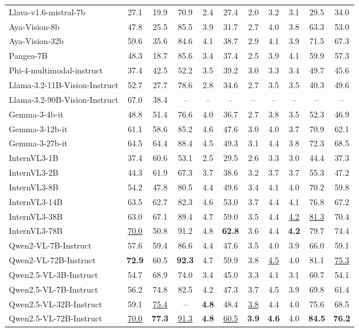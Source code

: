 \begin{table*}[t]
\begin{adjustbox}{max width=\linewidth}
\begin{tabular}{lcccccccccc}
Llava-v1.6-mistral-7b & 27.1 & 19.9 & 70.9 & 2.4 & 27.4 & 2.0 & 3.2 & 3.1 & 29.5 & 34.0 \\
Aya-Vision-8b & 47.8 & 25.5 & 85.5 & 3.9 & 31.7 & 2.7 & 4.0 & 3.8 & 63.3 & 53.0 \\
Aya-Vision-32b & 59.6 & 35.6 & 84.6 & 4.1 & 38.7 & 2.9 & 4.1 & 3.9 & 71.5 & 67.3 \\
Pangea-7B & 48.3 & 18.7 & 85.6 & 3.4 & 37.4 & 2.5 & 3.9 & 4.1 & 59.9 & 57.3 \\
Phi-4-multimodal-instruct & 37.4 & 42.5 & 52.2 & 3.5 & 39.2 & 3.0 & 3.3 & 3.4 & 49.7 & 45.6 \\
Llama-3.2-11B-Vision-Instruct & 52.7 & 27.7 & 78.6 & 2.8 & 34.6 & 2.7 & 3.5 & 3.5 & 40.3 & 49.6 \\
Llama-3.2-90B-Vision-Instruct & 67.0 & 38.4 & -- & -- & -- & -- & -- & -- & -- & -- \\
Gemma-3-4b-it & 48.8 & 51.4 & 76.6 & 4.0 & 36.7 & 2.7 & 3.8 & 3.5 & 52.3 & 46.9 \\
Gemma-3-12b-it & 61.1 & 58.6 & 85.2 & 4.6 & 47.6 & 3.0 & 4.0 & 3.7 & 70.9 & 62.1 \\
Gemma-3-27b-it & 64.5 & 64.4 & 88.4 & 4.5 & 49.3 & 3.1 & 4.4 & 3.8 & 72.3 & 68.5 \\
InternVL3-1B & 37.4 & 60.6 & 53.1 & 2.5 & 29.5 & 2.6 & 3.3 & 3.0 & 44.4 & 37.3 \\
InternVL3-2B & 44.3 & 61.9 & 67.3 & 3.7 & 38.6 & 3.2 & 3.7 & 3.7 & 55.3 & 47.2 \\
InternVL3-8B & 54.2 & 47.8 & 80.5 & 4.4 & 49.6 & 3.4 & 4.1 & 4.0 & 70.2 & 59.8 \\
InternVL3-14B & 63.5 & 62.7 & 82.3 & 4.6 & 53.0 & 3.7 & 4.4 & 4.1 & 76.8 & 67.2 \\
InternVL3-38B & 63.0 & 67.1 & 89.4 & 4.7 & 59.0 & 3.5 & 4.4 & \underline{4.2} & \underline{81.3} & 70.4 \\
InternVL3-78B & \underline{70.0} & 50.8 & 91.2 & 4.8 & \textbf{62.8} & 3.6 & 4.4 & \textbf{4.2} & 79.7 & 74.4 \\
Qwen2-VL-7B-Instruct & 57.6 & 59.4 & 86.6 & 4.4 & 47.6 & 3.5 & 4.0 & 3.9 & 66.0 & 59.1 \\
Qwen2-VL-72B-Instruct & \textbf{72.9} & 60.5 & \textbf{92.3} & 4.7 & 59.9 & 3.8 & \underline{4.5} & 4.0 & 81.1 & \underline{75.3} \\
Qwen2.5-VL-3B-Instruct & 54.7 & 68.9 & 74.0 & 3.4 & 45.0 & 3.3 & 4.1 & 3.1 & 60.7 & 54.1 \\
Qwen2.5-VL-7B-Instruct & 56.2 & 74.8 & 82.5 & 4.2 & 47.3 & 3.7 & 4.5 & 3.9 & 69.8 & 61.4 \\
Qwen2.5-VL-32B-Instruct & 59.1 & \underline{75.4} & -- & \textbf{4.8} & 48.4 & \underline{3.8} & 4.4 & 4.0 & 75.6 & 68.5 \\
Qwen2.5-VL-72B-Instruct & \underline{70.0} & \textbf{77.3} & \underline{91.3} & \textbf{4.8} & \underline{60.5} & \textbf{3.9} & \textbf{4.6} & 4.0 & \textbf{84.5} & \textbf{76.2} \\
\bottomrule
\end{tabular}
\end{adjustbox}
\end{table*}
\endgroup
